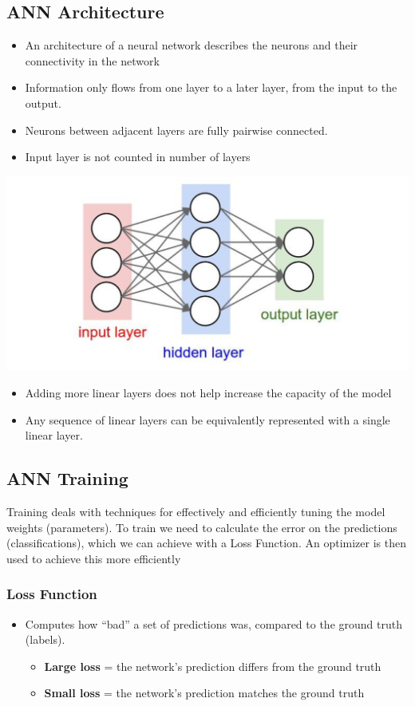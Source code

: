 \documentclass[11pt]{article}
\begin{document}
\subsection{ANN Architecture}
\begin{itemize}
\item An architecture of a neural network describes the neurons and their connectivity in the network
\item Information only flows from one layer to a later layer, from the input to the output.
\item Neurons between adjacent layers are fully pairwise connected.
\item Input layer is not counted in number of layers 
\end{itemize}
\begin{center}
\includegraphics[scale=0.5]{images/ann.png}
\end{center}
\begin{itemize}
\item Adding more linear layers does not help increase the capacity of the model
\item Any sequence of linear layers can be equivalently represented with a single linear layer.
\end{itemize}

\subsection{ANN Training}
Training deals with techniques for effectively and efficiently tuning the model weights (parameters). To train we need to calculate the error on the predictions (classifications), which we can achieve with a Loss Function. An optimizer is then used to achieve this more efficiently
\subsubsection{Loss Function}
\begin{itemize}
\item Computes how “bad” a set of predictions was, compared to the ground truth (labels).
\begin{itemize}
\item \textbf{Large loss} = the network’s prediction differs from the ground truth
\item \textbf{Small loss} = the network’s prediction matches the ground truth
\end{itemize}
\end{itemize}
\end{document}
